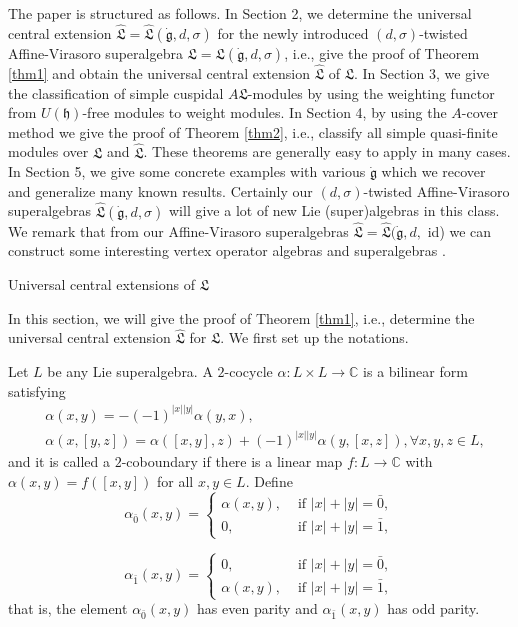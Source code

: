 \documentclass[1p]{elsarticle}
\numberwithin{equation}{section}
\def\dg{\dot{\mathfrak{g}}}
\def\fL{\mathfrak{L}}
\def\bC{\mathbb{C}}
\def\hL{\hat{\fL}}
\begin{document}
The paper is structured as follows. In Section 2, we  determine  the universal central extension $\hL=\hL(\dg,d,\sigma)$ for the newly introduced  $(d,\sigma)$-twisted Affine-Virasoro superalgebra $\fL=\fL(\dg,d,\sigma)$, i.e., give the proof of Theorem \ref{thm1} and obtain the universal central extension $\hL$ of $\fL$.  
In Section 3, we   give the classification of simple cuspidal $A\fL$-modules  by using the weighting functor from $U(\mathfrak{h})$-free modules to weight modules.  In Section 4, by using the $A$-cover method  we   give the proof of Theorem \ref{thm2}, i.e., classify all simple   quasi-finite modules over  $\fL$ and $\hL$. These  theorems are generally   easy to apply in many cases. In Section 5, we   give some concrete examples with various $\dg$  which  we  recover and generalize    many known results. Certainly our $(d,\sigma)$-twisted Affine-Virasoro superalgebras $\hL(\dg,d,\sigma)$ will give a lot of new Lie (super)algebras in this class. We remark that  from our   Affine-Virasoro superalgebras $\hL=\hL(\dg,d,$ id) we can construct some interesting vertex operator algebras and superalgebras \cite{L1, L2}.


 \begin{section}{Universal central extensions of $\fL$}\end{section}

 In this section, we will give the proof of Theorem \ref{thm1}, i.e., determine the universal central extension $\hL$ for $\fL$. We first set up the notations.

 Let $L$ be any Lie superalgebra. A $2$-cocycle  $\alpha: L\times L\rightarrow \bC $  is a bilinear form satisfying
\begin{align*}
&\alpha(x,y)=-(-1)^{|x||y|}\alpha(y,x),\\
&\alpha(x,[y,z])=\alpha([x,y],z)+(-1)^{|x||y|}\alpha(y,[x,z]),\forall x,y,z\in L,
\end{align*}
and it is called a $2$-coboundary if there is a linear map $f:L\rightarrow \bC$ with $\alpha(x,y)=f([x,y])$ for all $x,y\in L$. Define
$$\alpha_{\bar0}(x,y)=\left\{ \begin{array}{cl}
	\alpha(x,y), &\text{ if } |x|+|y|=\bar 0, \\
		0, &\text{ if } |x|+|y|=\bar 1,\end{array} \right.$$
		
		$$\alpha_{\bar 1}(x,y)=\left\{ \begin{array}{cl}
			0, &\text{ if } |x|+|y|=\bar 0, \\
			\alpha(x,y), &\text{ if } |x|+|y|=\bar 1,
\end{array} \right.$$ that is, the element $\alpha_{\bar 0}(x,y)$ has even parity and $\alpha_{\bar 1}(x,y)$ has odd parity.
\end{document}
